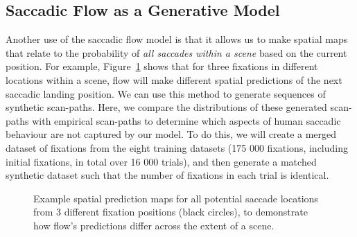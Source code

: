 \subsection{Saccadic Flow as a Generative Model}
\label{sec:humanComp}

Another use of the saccadic flow model is that it allows us to make spatial maps that relate to the probability of \emph{all saccades within a scene} based on the current position. For example, Figure~\ref{fig:flowPredict} shows that for three fixations in different locations within a scene, flow will make different spatial predictions of the next saccadic landing position. We can use this method to generate sequences of synthetic scan-paths. Here, we compare the distributions of these generated scan-paths with empirical scan-paths to determine which aspects of human saccadic behaviour are not captured by our model. To do this, we will create a merged dataset of fixations from the eight training datasets (175 000 fixations, including initial fixations, in total over 16 000 trials), and then generate a matched synthetic dataset such that the number of fixations in each trial is identical. 

\begin{figure}[htb]
\centering
{}
\caption[]{Example spatial prediction maps for all potential saccade locations from 3 different fixation positions (black circles), to demonstrate how flow's predictions differ across the extent of a scene.}
\label{fig:flowPredict}
\end{figure}

